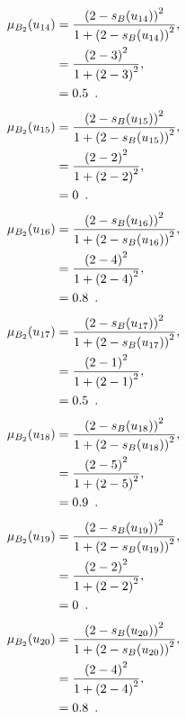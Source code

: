 \documentclass[a4paper,openany]{book}
\begin{document}
				\begin{align}
					\mu_{B_2}(u_{14}) &= \frac{\left(2-s_B(u_{14})\right)^2}{1 + \left(2-s_B(u_{14})\right)^2} ,\\
					&= \frac{\left(2-3\right)^2}{1 + \left(2-3\right)^2} \notag ,\\
					&= 0.5 \enspace. \notag
				\end{align}
				\begin{align}
					\mu_{B_2}(u_{15}) &= \frac{\left(2-s_B(u_{15})\right)^2}{1 + \left(2-s_B(u_{15})\right)^2} ,\\
					&= \frac{\left(2-2\right)^2}{1 + \left(2-2\right)^2} \notag ,\\
					&= 0 \enspace. \notag
				\end{align}
				\begin{align}
					\mu_{B_2}(u_{16}) &= \frac{\left(2-s_B(u_{16})\right)^2}{1 + \left(2-s_B(u_{16})\right)^2} ,\\
					&= \frac{\left(2-4\right)^2}{1 + \left(2-4\right)^2} \notag ,\\
					&= 0.8 \enspace. \notag
				\end{align}
				\begin{align}
					\mu_{B_2}(u_{17}) &= \frac{\left(2-s_B(u_{17})\right)^2}{1 + \left(2-s_B(u_{17})\right)^2} ,\\
					&= \frac{\left(2-1\right)^2}{1 + \left(2-1\right)^2} \notag ,\\
					&= 0.5 \enspace. \notag
				\end{align}
				\begin{align}
					\mu_{B_2}(u_{18}) &= \frac{\left(2-s_B(u_{18})\right)^2}{1 + \left(2-s_B(u_{18})\right)^2} ,\\
					&= \frac{\left(2-5\right)^2}{1 + \left(2-5\right)^2} \notag ,\\
					&= 0.9 \enspace. \notag
				\end{align}
				\begin{align}
					\mu_{B_2}(u_{19}) &= \frac{\left(2-s_B(u_{19})\right)^2}{1 + \left(2-s_B(u_{19})\right)^2} ,\\
					&= \frac{\left(2-2\right)^2}{1 + \left(2-2\right)^2} \notag ,\\
					&= 0 \enspace. \notag
				\end{align}
				\begin{align}
					\mu_{B_2}(u_{20}) &= \frac{\left(2-s_B(u_{20})\right)^2}{1 + \left(2-s_B(u_{20})\right)^2} ,\\
					&= \frac{\left(2-4\right)^2}{1 + \left(2-4\right)^2} \notag ,\\
					&= 0.8 \enspace. \notag
				\end{align}
\end{document}
